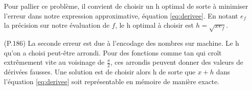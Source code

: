 \documentclass{article}
\begin{document}
Pour pallier ce problème, il convient de choisir un h optimal de sorte à minimiser l'erreur dans notre expression approximative, équation \ref{eq:derivee}. En notant $e_f$ la précision sur notre évaluation de $f$, le h optimal à choisir est $h = \sqrt{xe_f}$.
\newline

(P.186) La seconde erreur est due à l'encodage des nombres sur machine. Le h qu'on a choisi peut-être arrondi. Pour des fonctions comme tan qui croît extrêmement vite au voisinage de $\frac{\pi}{2}$, ces arrondis peuvent donner des valeurs de dérivées fausses. Une solution est de choisir alors h de sorte que $x+h$ dans l'équation \ref{eq:derivee} soit représentable en mémoire de manière exacte.
\end{document}
